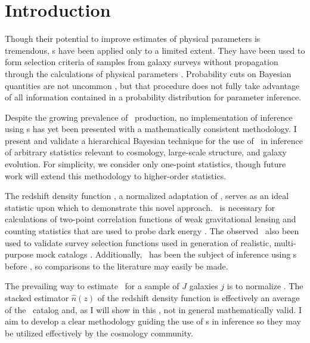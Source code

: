 \section{Introduction}

Though their potential to improve estimates of physical parameters is tremendous, \pzpdf s have been applied only to a limited extent.  
They have been used to form selection criteria of samples from galaxy surveys without propagation 
through the calculations of physical parameters \citep{VanBreukelen2009,Viironen2015}.  
Probability cuts on Bayesian quantities are not uncommon \citep{Leung2015, DiPompeo2015a}, but that procedure does not fully take advantage of all information contained in a probability distribution for parameter inference.  

Despite the growing prevalence of \pzpdf\ production, no implementation of inference using \pzpdf s has yet been presented with a mathematically consistent methodology.  
I present and validate a hierarchical Bayesian technique for the use of \pzpdf\ in inference of arbitrary statistics relevant to cosmology, large-scale structure, and galaxy evolution.  
For simplicity, we consider only one-point statistics, though future work will extend this methodology to higher-order statistics.

The redshift density function \nz, a normalized adaptation of , serves as an ideal statistic upon which to demonstrate this novel approach.  
\Nz\ is necessary for calculations of two-point correlation functions of weak gravitational lensing and counting statistics that are used to probe dark energy \citep{Masters2015}.  
The observed \Nz\ also been used to validate survey selection functions used in generation of realistic, multi-purpose mock catalogs \citep{Norberg2002}.  
Additionally, \Nz\ has been the subject of inference using \pzpdf s before \citep{Sheldon2012, Hildebrandt2012, Kelly2014, Benjamin2013, Bonnett2015a, Viironen2015, Asorey2016, Leistedt2016}, so comparisons to the literature may easily be made. 

The prevailing way to estimate \nz\ for a sample of $J$ galaxies $j$ is to normalize .
The stacked estimator $\hat{n}(z)$ of the redshift density function is effectively an average of the \pzpdf\ catalog and, as I will show in this \Chap, not in general mathematically valid.
I aim to develop a clear methodology guiding the use of \pzpdf s in inference so they may be utilized effectively by the cosmology community.

